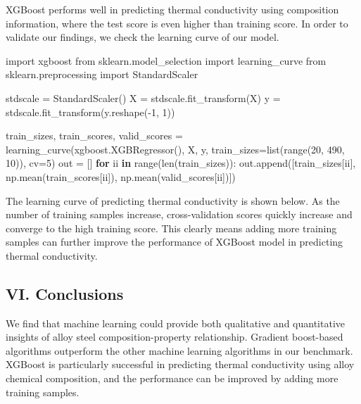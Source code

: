 \documentclass[11pt]{article}
\newenvironment{Shaded}{}{}
\newcommand{\KeywordTok}[1]{\textcolor[rgb]{0.00,0.44,0.13}{\textbf{{#1}}}}
\newcommand{\DecValTok}[1]{\textcolor[rgb]{0.25,0.63,0.44}{{#1}}}
\newcommand{\NormalTok}[1]{{#1}}
\newcommand{\ImportTok}[1]{{#1}}
\newcommand{\ControlFlowTok}[1]{\textcolor[rgb]{0.00,0.44,0.13}{\textbf{{#1}}}}
\newcommand{\OperatorTok}[1]{\textcolor[rgb]{0.40,0.40,0.40}{{#1}}}
\newcommand{\BuiltInTok}[1]{{#1}}
\begin{document}
XGBoost performs well in predicting thermal conductivity using
composition information, where the test score is even higher than
training score. In order to validate our findings, we check the learning
curve of our model.

    \begin{Shaded}
\begin{Highlighting}[]
\ImportTok{import}\NormalTok{ xgboost}
\ImportTok{from}\NormalTok{ sklearn.model_selection }\ImportTok{import}\NormalTok{ learning_curve}
\ImportTok{from}\NormalTok{ sklearn.preprocessing }\ImportTok{import}\NormalTok{ StandardScaler}

\NormalTok{stdscale }\OperatorTok{=}\NormalTok{ StandardScaler()}
\NormalTok{X }\OperatorTok{=}\NormalTok{ stdscale.fit_transform(X)}
\NormalTok{y }\OperatorTok{=}\NormalTok{ stdscale.fit_transform(y.reshape(}\OperatorTok{-}\DecValTok{1}\NormalTok{, }\DecValTok{1}\NormalTok{)) }

\NormalTok{train_sizes, train_scores, valid_scores }\OperatorTok{=}\NormalTok{ learning_curve(xgboost.XGBRegressor(), X, y, }
\NormalTok{                                                         train_sizes}\OperatorTok{=}\BuiltInTok{list}\NormalTok{(}\BuiltInTok{range}\NormalTok{(}\DecValTok{20}\NormalTok{, }\DecValTok{490}\NormalTok{, }\DecValTok{10}\NormalTok{)), cv}\OperatorTok{=}\DecValTok{5}\NormalTok{)}
\NormalTok{out }\OperatorTok{=}\NormalTok{ []}
\ControlFlowTok{for}\NormalTok{ ii }\KeywordTok{in} \BuiltInTok{range}\NormalTok{(}\BuiltInTok{len}\NormalTok{(train_sizes)):}
\NormalTok{    out.append([train_sizes[ii], np.mean(train_scores[ii]), np.mean(valid_scores[ii])])}
\end{Highlighting}
\end{Shaded}

    The learning curve of predicting thermal conductivity is shown below. As
the number of training samples increase, cross-validation scores quickly
increase and converge to the high training score. This clearly means
adding more training samples can further improve the performance of
XGBoost model in predicting thermal conductivity.

    

    \hypertarget{vi.-conclusions}{%
\subsection{VI. Conclusions}\label{vi.-conclusions}}

    We find that machine learning could provide both qualitative and
quantitative insights of alloy steel composition-property relationship.
Gradient boost-based algorithms outperform the other machine learning
algorithms in our benchmark. XGBoost is particularly successful in
predicting thermal conductivity using alloy chemical composition, and
the performance can be improved by adding more training samples.
\end{document}
